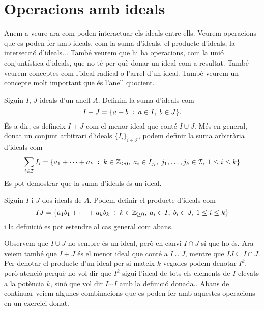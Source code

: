 \documentclass[../main.tex]{subfiles}
\begin{document}
\section{Operacions amb ideals}

Anem a veure ara com poden interactuar els ideals entre ells. Veurem operacions que es poden fer amb ideals, com la suma d'ideals, el producte d'ideals, la intersecció d'ideals... També veurem que hi ha operacions, com la unió conjuntística d'ideals, que no té per què donar un ideal com a resultat. També veurem conceptes com l'ideal radical o l'arrel d'un ideal. També veurem un concepte molt important que és l'anell quocient.


\begin{defi}
\label{def:suma} Siguin $I$, $J$ ideals d'un anell $A$. Definim la suma d'ideals com
\begin{equation}
    \notag
    I+J = \{a+b\;:\;a\in I,\;b\in J\}.
\end{equation}
És a dir, es defineix $I+J$ com el menor ideal que conté $I\cup J$. Més en general, donat un conjunt arbitrari d'ideals $\{I_i\}_{i\in\mathcal{I}}$, podem definir la suma arbitrària d'ideals com 
\begin{equation}
    \notag
    \sum_{i\in\mathcal{I}} I_i = \{a_1+\cdots+a_k\;:\;k\in\mathbb{Z}_{\geq 0},\;a_i\in I_{j_i},\;j_1,\ldots,j_k\in \mathcal{I},\;1\leq i\leq k\}
\end{equation}
Es pot demostrar que la suma d'ideals és un ideal.
\end{defi}

\begin{defi}
\label{def:producteideals} Siguin $I$ i $J$ dos ideals de $A$. Podem definir el producte d'ideals com
\begin{equation}
    \notag
    IJ = \{a_1b_1+\cdots+a_kb_k\;:\;k\in\mathbb{Z}_{\geq 0},\;a_i\in I,\;b_i\in J,\;1\leq i\leq k\}
\end{equation}
i la definició es pot estendre al cas general com abans.
\end{defi}

Observem que $I\cup J$ no sempre és un ideal, però en canvi $I\cap J$ sí que ho és. Ara veiem també que $I+J$ és el menor ideal que conté a $I\cup J$, mentre que $IJ\subseteq I\cap J$. Per denotar el producte d'un ideal per si mateix $k$ vegades podem denotar $I^k$, però atenció perquè no vol dir que $I^k$ sigui l'ideal de tots els elements de $I$ elevats a la potència $k$, sinó que vol dir $I\cdots I$ amb la definició donada.. Abans de continuar veiem algunes combinacions que es poden fer amb aquestes operacions en un exercici donat.
\end{document}
